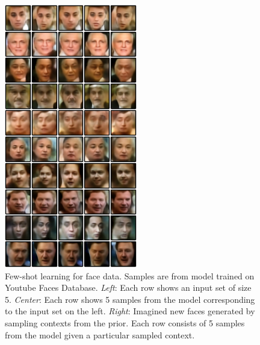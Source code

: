 \documentclass{article} %
\begin{document}
\begin{figure}[!hb]
\begin{minipage}{0.3\textwidth}
\includegraphics[width=1\linewidth]{rgb_uncond_samples.png}
\end{minipage}
\caption{Few-shot learning for face data. Samples are from model trained on Youtube Faces Database. \emph{Left}: Each row shows an input set of size 5. \emph{Center}: Each row shows 5 samples from the model corresponding to the input set on the left. \emph{Right}: Imagined new faces generated by sampling contexts from the prior. Each row consists of 5 samples from the model given a particular sampled context. \label{fig:table_faces}}
\end{figure}
\end{document}
